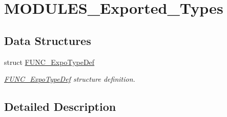 \hypertarget{group___m_o_d_u_l_e_s___exported___types}{}\section{M\+O\+D\+U\+L\+E\+S\+\_\+\+Exported\+\_\+\+Types}
\label{group___m_o_d_u_l_e_s___exported___types}
\subsection*{Data Structures}
\begin{DoxyCompactItemize}
\item 
struct \hyperlink{struct_f_u_n_c___expo_type_def}{F\+U\+N\+C\+\_\+\+Expo\+Type\+Def}
\begin{DoxyCompactList}\small\item\em \hyperlink{struct_f_u_n_c___expo_type_def}{F\+U\+N\+C\+\_\+\+Expo\+Type\+Def} structure definition. \end{DoxyCompactList}\end{DoxyCompactItemize}


\subsection{Detailed Description}
